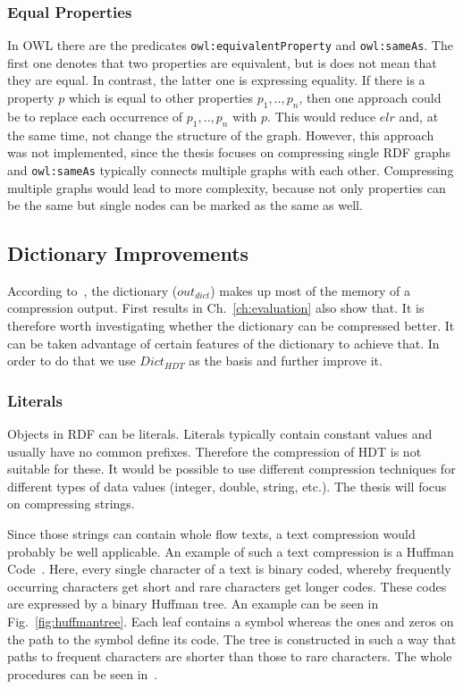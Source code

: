 \subsubsection{Equal Properties}

In OWL there are the predicates {\tt owl:equivalentProperty} and {\tt owl:sameAs}. The first one denotes that two properties are equivalent, but is does not mean that they are equal. In contrast, the latter one is expressing equality. If there is a property $p$ which is equal to other properties $p_1,..,p_n$, then one approach could be to replace each occurrence of $p_1,..,p_n$ with $p$. This would reduce $elr$ and, at the same time, not change the structure of the graph. However, this approach was not implemented, since the thesis focuses on compressing single RDF graphs and {\tt owl:sameAs} typically connects multiple graphs with each other. Compressing multiple graphs would lead to more complexity, because not only properties can be the same but single nodes can be marked as the same as well.


\subsection{Dictionary Improvements}\label{sec:approachDictImprovements}


According to~\cite{hdt}, the dictionary ($out_{dict}$) makes up most of the memory of a compression output. First results in Ch.~\ref{ch:evaluation} also show that. It is therefore worth investigating whether the dictionary can be compressed better. It can be taken advantage of certain features of the dictionary to achieve that. In order to do that we use $Dict_{HDT}$ as the basis and further improve it.

\subsubsection{Literals}\label{sec:approachLiterals}

Objects in RDF can be literals. Literals typically contain constant values and usually have no common prefixes. Therefore the compression of HDT is not suitable for these. It would be possible to use different compression techniques for different types of data values (integer, double, string, etc.). The thesis will focus on compressing strings.

Since those strings can contain whole flow texts, a text compression would probably be well applicable. An example of such a text compression is a Huffman Code~\cite{huffman}. Here, every single character of a text is binary coded, whereby frequently occurring characters get short and rare characters get longer codes. These codes are expressed by a binary Huffman tree. An example can be seen in Fig.~\ref{fig:huffmantree}. Each leaf contains a symbol whereas the ones and zeros on the path to the symbol define its code. The tree is constructed in such a way that paths to frequent characters are shorter than those to rare characters. The whole procedures can be seen in~\cite{huffman}.

